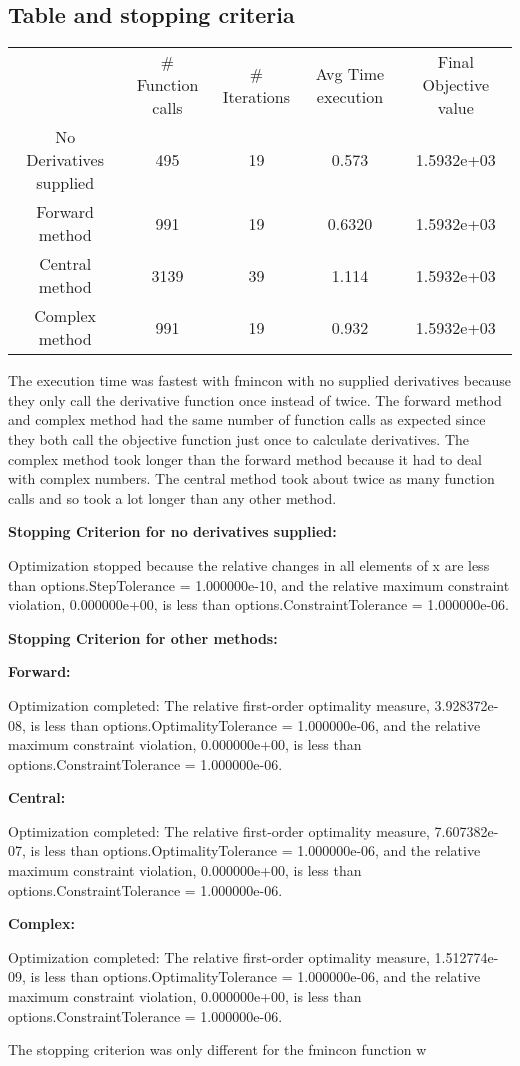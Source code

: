 \documentclass[a4paper]{article}
\begin{document}
    \subsection{Table and stopping criteria}
    \begin{center}
    \begin{tabular}[h]{c c c c c}
        & \# Function calls & \# Iterations & Avg Time execution& Final Objective value \\
        No Derivatives supplied&495&19&0.573 &1.5932e+03\\
        Forward method&991&19&0.6320 & 1.5932e+03\\
        Central method&3139&39&1.114 & 1.5932e+03\\ 
        Complex method&991&19&0.932  &   1.5932e+03 
    \end{tabular}
\end{center}

The execution time was fastest with fmincon with no supplied derivatives because they only call the derivative function once instead of twice.  
The forward method and complex method had the same number of function calls as expected since they both call the objective function just once to calculate derivatives. 
The complex method took longer than the forward method because it had to deal with complex numbers. 
The central method took about twice as many function calls and so took a lot longer than any other method.

\textbf{Stopping Criterion for no derivatives supplied: }

Optimization stopped because the relative changes in all elements of x are
less than options.StepTolerance = 1.000000e-10, and the relative maximum constraint
violation, 0.000000e+00, is less than options.ConstraintTolerance = 1.000000e-06.

\textbf{Stopping Criterion for other methods:}

\textbf{Forward:}

Optimization completed: The relative first-order optimality measure, 3.928372e-08, is less than options.OptimalityTolerance = 1.000000e-06, and the relative maximum constraint violation, 0.000000e+00, is less than options.ConstraintTolerance = 1.000000e-06.

\textbf{Central:}

Optimization completed: The relative first-order optimality measure, 7.607382e-07, is less than options.OptimalityTolerance = 1.000000e-06, and the relative maximum constraint violation, 0.000000e+00, is less than options.ConstraintTolerance = 1.000000e-06.

\textbf{Complex:}

Optimization completed: The relative first-order optimality measure, 1.512774e-09, is less than options.OptimalityTolerance = 1.000000e-06, and the relative maximum constraint violation, 0.000000e+00, is less than options.ConstraintTolerance = 1.000000e-06.

The stopping criterion was only different for the fmincon function w

 
\end{document}
